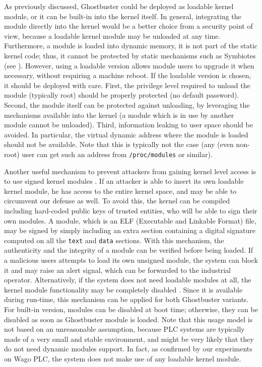 As previously discussed, Ghostbuster could be deployed as loadable kernel module, or it can be built-in into the kernel itself.
In general, integrating the module directly into the kernel would be a better choice from a security point of view,
because a loadable kernel module may be unloaded at any time. Furthermore, a module is loaded into dynamic memory, \ie it is not part of the static kernel code; thus,
it cannot be protected by static mechanisms such as Symbiotes (see ). However, using a loadable version allows module users to upgrade it
when necessary, without requiring a machine reboot.
If the loadable version is chosen, it should be deployed with care. First, the privilege level required to unload the module (typically root) should be properly protected
(\eg no default password). Second, the module itself can be protected against unloading, by leveraging the mechanisms available into the kernel
(\eg a module which is in use by another module cannot be unloaded). Third, information leaking to user space should be avoided. In particular,
the virtual dynamic address where the module is loaded should not be available. Note that this is typically not the case (\eg any (even non-root) user can get such an address
from \verb|/proc/modules| or similar).

Another useful mechanism to prevent attackers from gaining kernel level access is to use signed kernel modules \cite{signed-modules}.
If an attacker is able to insert its own loadable kernel module, he has access to the entire kernel space, and may be able to circumvent our defense as well.
To avoid this, the kernel can be compiled including hard-coded public keys of trusted entities, who will be able to sign their own modules.
A module, which is an ELF (Executable and Linkable Format) file, may be signed by simply including an extra section containing a digital signature
computed on all the \verb|text| and \verb|data| sections. With this mechanism, the authenticity and the integrity of a module can be verified before being loaded.
If a malicious users attempts to load its own unsigned module, the system can block it and may raise an alert signal,
which can be forwarded to the industrial operator. Alternatively, if the system does not need loadable modules at all,
the kernel module functionality may be completely disabled \cite{disable-modules}. Since it is available during run-time, this mechanism can be applied
for both Ghostbuster variants. For built-in version, modules can be disabled at boot time; otherwise, they can be disabled as soon as Ghostbuster module is loaded.
Note that this usage model is not based on an unreasonable assumption, because PLC systems are typically made of a very small and stable environment,
and might be very likely that they do not need dynamic modules support.
In fact, as confirmed by our experiments on Wago PLC, the system does not make use of any loadable kernel module.
